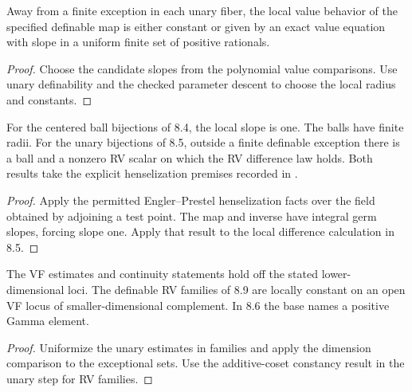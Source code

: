 \begin{lemma}
\label{lem:unary-slopes}
\leanok
Away from a finite exception in each unary fiber, the local value
behavior of the specified definable map is either constant or given
by an exact value equation with slope in a uniform finite set of
positive rationals.
\end{lemma}
\begin{proof}
\leanok
{}
Choose the candidate slopes from the polynomial value comparisons.
Use unary definability and the checked parameter descent to choose
the local radius and constants.
\end{proof}

\begin{lemma}
\label{lem:rv-difference}
\leanok
For the centered ball bijections of 8.4, the local slope is one.
The balls have finite radii. For the unary bijections of 8.5,
outside a finite definable exception there is a ball and a nonzero
RV scalar on which the RV difference law holds. Both results take
the explicit henselization premises recorded in
.
\end{lemma}
\begin{proof}
\leanok
{}
Apply the permitted Engler--Prestel henselization facts over the
field obtained by adjoining a test point. The map and inverse have
integral germ slopes, forcing slope one. Apply that result to the
local difference calculation in 8.5.
\end{proof}

\begin{lemma}
\label{lem:local-regularity}
\leanok
The VF estimates and continuity statements hold off the stated
lower-dimensional loci. The definable RV families of 8.9 are
locally constant on an open VF locus of smaller-dimensional
complement. In 8.6 the base names a positive Gamma element.
\end{lemma}
\begin{proof}
\leanok
{}
Uniformize the unary estimates in families and apply the dimension
comparison to the exceptional sets. Use the additive-coset
constancy result in the unary step for RV families.
\end{proof}

